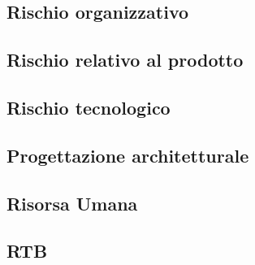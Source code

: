 \subsection{Rischio organizzativo} 

\subsection{Rischio relativo al prodotto} 

\subsection{Rischio tecnologico} 

\subsection{Progettazione architetturale} 

\subsection{Risorsa Umana} 

\subsection{RTB} 


